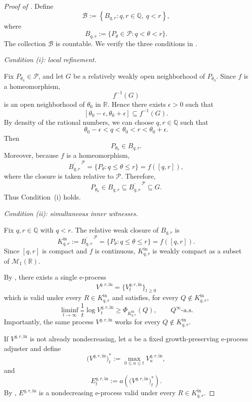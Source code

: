 \documentclass[12pt]{article}
\theoremstyle{spaced}
\theoremstyle{remark}
\begin{document}
\begin{proof}[Proof of ]
Define
\[
    \mathscr B
    :=
    \left\{
        B_{q,r}:
        q,r\in\mathbb Q,\ q<r
    \right\},
\]
where
\[
    B_{q,r}
    :=
    \{P_\theta\in\mathcal P:q<\theta<r\}.
\]
The collection $\mathscr B$ is countable. We verify the three
conditions in .

\medskip

\noindent
\emph{Condition \textup{(i)}: local refinement.}

Fix $P_{\theta_0}\in\mathcal P$, and let $G$ be a relatively
weakly open neighborhood of $P_{\theta_0}$. Since $f$ is a
homeomorphism,
\[
    f^{-1}(G)
\]
is an open neighborhood of $\theta_0$ in $\mathbb R$. Hence
there exists $\epsilon>0$ such that
\[
    [\theta_0-\epsilon,\theta_0+\epsilon]
    \subseteq
    f^{-1}(G).
\]
By density of the rational numbers, we can choose
$q,r\in\mathbb Q$ such that
\[
    \theta_0-\epsilon<q<\theta_0<r<\theta_0+\epsilon.
\]
Then
\[
    P_{\theta_0}\in B_{q,r}.
\]
Moreover, because $f$ is a homeomorphism,
\[
    \overline{B_{q,r}}^{\,\mathcal P}
    =
    \{P_\theta:q\le\theta\le r\}
    =
    f([q,r]),
\]
where the closure is taken relative to $\mathcal P$. Therefore,
\[
    P_{\theta_0}
    \in
    B_{q,r}
    \subseteq
    \overline{B_{q,r}}^{\,\mathcal P}
    \subseteq
    G.
\]
Thus Condition~\textup{(i)} holds.

\medskip

\noindent
\emph{Condition \textup{(ii)}: simultaneous inner witnesses.}

Fix $q,r\in\mathbb Q$ with $q<r$. The relative weak closure of
$B_{q,r}$ is
\[
    K_{q,r}^{\mathrm{in}}
    :=
    \overline{B_{q,r}}^{\,\mathcal P}
    =
    \{P_\theta:q\le\theta\le r\}
    =
    f([q,r]).
\]
Since $[q,r]$ is compact and $f$ is continuous,
$K_{q,r}^{\mathrm{in}}$ is weakly compact as a subset of
$\mathcal M_1(\mathbb R)$.

By , there exists a single
e-process
\[
    V^{q,r,\mathrm{in}}
    =
    \{V_t^{q,r,\mathrm{in}}\}_{t\ge0}
\]
which is valid under every $R\in K_{q,r}^{\mathrm{in}}$ and
satisfies, for every
$Q\notin K_{q,r}^{\mathrm{in}}$,
\[
    \liminf_{t\to\infty}
    \frac1t
    \log V_t^{q,r,\mathrm{in}}
    \ge
    \Phi_{K_{q,r}^{\mathrm{in}}}(Q),
    \qquad
    Q^\infty\text{-a.s.}
\]
Importantly, the same process $V^{q,r,\mathrm{in}}$ works for
every $Q\notin K_{q,r}^{\mathrm{in}}$.

If $V^{q,r,\mathrm{in}}$ is not already nondecreasing, let $a$
be a fixed growth-preserving e-process adjuster and define
\[
    \bigl(V^{q,r,\mathrm{in}}\bigr)_t^*
    :=
    \max_{0\le u\le t}
    V_u^{q,r,\mathrm{in}},
\]
and
\[
    E_t^{q,r,\mathrm{in}}
    :=
    a\left(
        \bigl(V^{q,r,\mathrm{in}}\bigr)_t^*
    \right).
\]
By ,
$E^{q,r,\mathrm{in}}$ is a nondecreasing e-process valid under
every $R\in K_{q,r}^{\mathrm{in}}$.


\end{proof}
\end{document}
